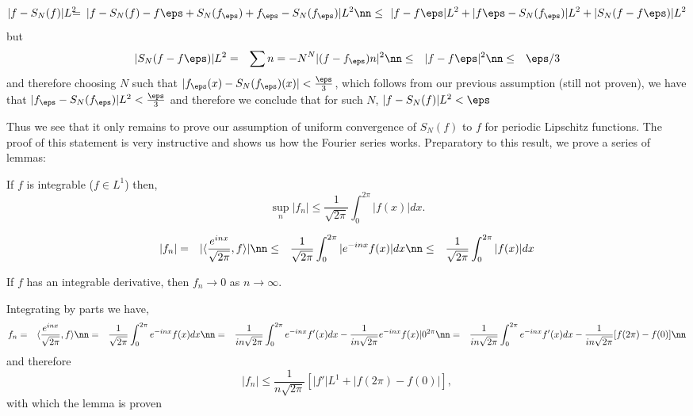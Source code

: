 \begin{eqnarray*} 
  |f-S_N(f)|{L^2} \!\!\!\! &=& \!\!\! |f-S_N(f) - f{\eps} + S_N(f_{\eps}) + f_{\eps} - S_N(f_{\eps}) |{L^2} \nn 
  &\leq& \!\!
|f-f{\eps}|{L^2} + |f{\eps}-S_N(f_{\eps})|{L^2} + |S_N(f-f{\eps})|{L^2} 
\end{eqnarray*} 
% 
but 
\begin{eqnarray} 
  |S_N(f-f{\eps})|{L^2} &=& \sum{n=-N}^{N}|(f-f_{\eps})n|^2 \nn &\leq& |f-f{\eps}|^2 \nn 
  &\leq& \eps/3 
\end{eqnarray} 
% 
and therefore choosing $N$ such that $|f_{\eps}(x) - S_N(f_{\eps})(x)| < \frac{\eps}{3}$, 
which follows from our previous assumption (still not proven), 
we have that $|f_{\eps} - S_N(f_{\eps})|{L^2} < \frac{\eps}{3}$ 
and therefore we conclude that for such $N$, $|f - S_N(f)|{L^2} < \eps$ 
\epru

Thus we see that it only remains to prove our assumption of uniform convergence of $S_N(f)$ to $f$ for periodic Lipschitz functions. The proof of this statement is very instructive and shows us how the Fourier series works. Preparatory to this result, we prove a series of lemmas:

\blem If $f$ is integrable ($f \in L^1$) then, 
\begin{equation} 
  \sup_n{|f_n|} \leq \frac{1}{\sqrt{2\pi}} \int_0^{2\pi}|f(x)| dx. 
\end{equation} 
\elem

\bpru 
\begin{eqnarray} |f_n| &=& |\langle \frac{e^{inx}}{\sqrt{2\pi}},f \rangle | \nn 
  &\leq& \frac{1}{\sqrt{2\pi}}\int_0^{2\pi}|e^{-inx}f(x)|dx \nn 
  &\leq& \frac{1}{\sqrt{2\pi}}\int_0^{2\pi}|f(x)|dx 
\end{eqnarray} 
\epru

\blem 
If $f$ has an integrable derivative, then $f_n \to 0$ as $n \to \infty$. 
\elem

\bpru 
Integrating by parts we have, 
\begin{eqnarray*} f_n &=& \langle \frac{e^{inx}}{\sqrt{2\pi}},f \rangle \nn 
  &=& \frac{1}{\sqrt{2\pi}}\int_0^{2\pi} e^{-inx}f(x)dx \nn 
  &=& \frac{1}{in\sqrt{2\pi}}\int_0^{2\pi} e^{-inx}f'(x)dx -\frac{1}{in\sqrt{2\pi}}e^{-inx}f(x)|0^{2\pi} \nn 
  &=& \frac{1}{in\sqrt{2\pi}}\int_0^{2\pi} e^{-inx}f'(x)dx -\frac{1}{in\sqrt{2\pi}}[f(2\pi)-f(0)] \nn 
\end{eqnarray*} 
and therefore 
\begin{equation} 
  |f_n| \leq \frac{1}{n\sqrt{2\pi}}[|f'|{L^1} + |f(2\pi)-f(0)|], 
\end{equation} 
with which the lemma is proven 
\epru

